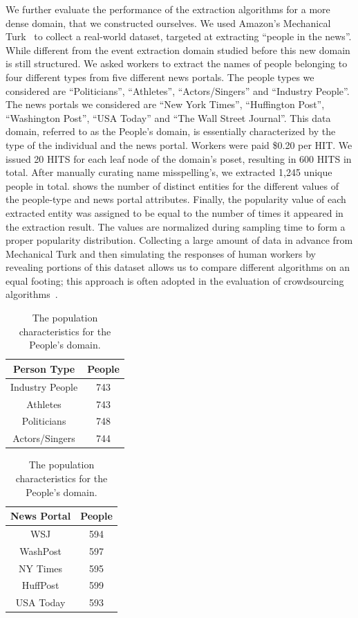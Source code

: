 We further evaluate the performance of the extraction algorithms for a more dense domain, that we constructed ourselves. We used Amazon's Mechanical Turk~\cite{mturk} to collect a real-world dataset, targeted at extracting ``people in the news''. While different from the event extraction domain studied before this new domain is still structured. We asked workers to extract the names of people belonging to four different types from five different news portals. The people types we considered are ``Politicians'', ``Athletes'', ``Actors/Singers'' and ``Industry People''. The news portals we considered are ``New York Times'', ``Huffington Post'', ``Washington Post'', ``USA  Today'' and ``The Wall Street Journal''. This data domain, referred to as the People's domain, is essentially characterized by the type of the individual and the news portal. Workers were paid \$0.20 per HIT. We issued 20 HITS for each leaf node of the domain's poset, resulting in 600 HITS in total. After manually curating name misspelling's, we extracted 1,245 unique people in total.  shows the number of distinct entities for the different values of the people-type and news portal attributes. Finally, the popularity value of each extracted entity was assigned to be equal to the number of times it appeared in the extraction result. The values are normalized during sampling time to form a proper popularity distribution. Collecting a large amount of data in advance from Mechanical Turk and then simulating the responses of human workers by revealing portions of this dataset allows us to compare different algorithms on an equal footing; this approach is often adopted in the evaluation of crowdsourcing algorithms~\cite{DBLP:journals/pvldb/ParameswaranBG0PW14, marcus:2011,trushkowsky:2013}.

\begin{table}
\center
\caption{The population characteristics for the People's domain.}
\label{tab:ptypedata}
\begin{tabular}{|c|c|}
\hline
\textbf{Person Type} & \textbf{People} \\ \hline
Industry People & 743 \\
Athletes & 743 \\
Politicians & 748 \\
Actors/Singers & 744 \\ \hline
\end{tabular}
\quad
\begin{tabular}{|c|c|}
\hline
\textbf{News Portal} & \textbf{People} \\ \hline
WSJ & 594 \\
WashPost & 597 \\
NY Times & 595 \\
HuffPost & 599 \\
USA Today & 593 \\ \hline
\end{tabular}
\end{table}

